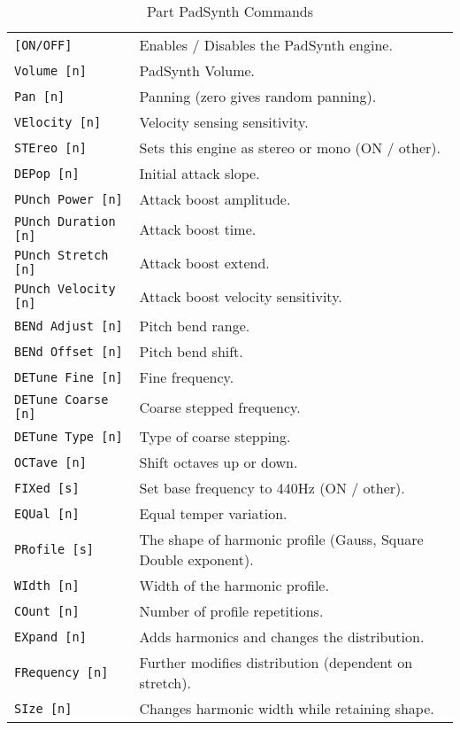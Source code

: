    \begin{table}[H]
      \centering
      \caption{Part PadSynth Commands}
      \label{table:yoshimi_part_padsynth_commands}
      \begin{tabular}{l l}
\texttt{[ON/OFF]} &
   Enables / Disables the PadSynth engine. \\
\texttt{Volume [n]} &
   PadSynth Volume. \\
\texttt{Pan [n]} &
   Panning (zero gives random panning).\\
\texttt{VElocity [n]} &
   Velocity sensing sensitivity. \\
\texttt{STEreo [n]} &
   Sets this engine as stereo or mono (ON / other). \\
\texttt{DEPop [n]} &
   Initial attack slope.   \\
\texttt{PUnch Power [n]} &
   Attack boost amplitude. \\
\texttt{PUnch Duration [n]} &
   Attack boost time. \\
\texttt{PUnch Stretch [n]} &
   Attack boost extend. \\
\texttt{PUnch Velocity [n]} &
   Attack boost velocity sensitivity. \\
\texttt{BENd Adjust [n]} &
   Pitch bend range. \\
\texttt{BENd Offset [n]} &
   Pitch bend shift. \\
\texttt{DETune Fine [n]} &
   Fine frequency. \\
\texttt{DETune Coarse [n]} &
   Coarse stepped frequency. \\
\texttt{DETune Type [n]} &
   Type of coarse stepping. \\
\texttt{OCTave [n]} &
   Shift octaves up or down. \\
\texttt{FIXed [s]} &
   Set base frequency to 440Hz (ON / other). \\
\texttt{EQUal [n]} &
   Equal temper variation. \\
\texttt{PRofile [s]} &
   The shape of harmonic profile (Gauss, Square Double exponent). \\
\texttt{WIdth [n]} &
   Width of the harmonic profile. \\
\texttt{COunt [n]} &
   Number of profile repetitions. \\
\texttt{EXpand [n]} &
   Adds harmonics and changes the distribution. \\
\texttt{FRequency [n]} &
   Further modifies distribution (dependent on stretch). \\
\texttt{SIze [n]} &
   Changes harmonic width while retaining shape. \\

\end{tabular}
\end{table}
